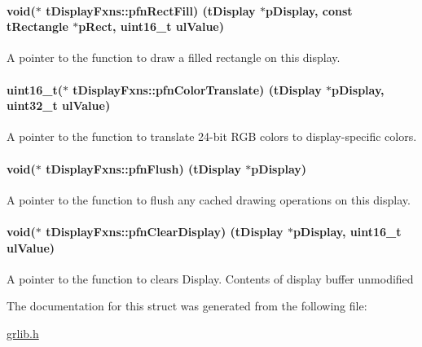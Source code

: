 \paragraph[{pfn\+Rect\+Fill}]{\setlength{\rightskip}{0pt plus 5cm}void($\ast$ t\+Display\+Fxns\+::pfn\+Rect\+Fill) ({\bf t\+Display} $\ast$p\+Display, const {\bf t\+Rectangle} $\ast$p\+Rect, uint16\+\_\+t ul\+Value)}\label{structt_display_fxns_a161a515401ad8e9627ec5f0c84f413c9}


A pointer to the function to draw a filled rectangle on this display. 

\paragraph[{pfn\+Color\+Translate}]{\setlength{\rightskip}{0pt plus 5cm}uint16\+\_\+t($\ast$ t\+Display\+Fxns\+::pfn\+Color\+Translate) ({\bf t\+Display} $\ast$p\+Display, uint32\+\_\+t ul\+Value)}\label{structt_display_fxns_ac35ce70cabfe85d0265c064ecd2fbfa8}
A pointer to the function to translate 24-\/bit R\+G\+B colors to display-\/specific colors. 
\paragraph[{pfn\+Flush}]{\setlength{\rightskip}{0pt plus 5cm}void($\ast$ t\+Display\+Fxns\+::pfn\+Flush) ({\bf t\+Display} $\ast$p\+Display)}\label{structt_display_fxns_a1a96d7181f6226e269fc55186121857d}
A pointer to the function to flush any cached drawing operations on this display. 
\paragraph[{pfn\+Clear\+Display}]{\setlength{\rightskip}{0pt plus 5cm}void($\ast$ t\+Display\+Fxns\+::pfn\+Clear\+Display) ({\bf t\+Display} $\ast$p\+Display, uint16\+\_\+t ul\+Value)}\label{structt_display_fxns_a823e2142ba4dea428121839c52ea76aa}
A pointer to the function to clears Display. Contents of display buffer unmodified 

The documentation for this struct was generated from the following file\+:\begin{DoxyCompactItemize}
\item 
\hyperlink{grlib_8h}{grlib.\+h}\end{DoxyCompactItemize}
